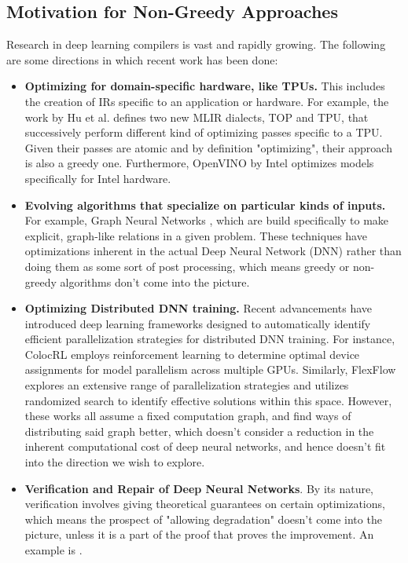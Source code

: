 \documentclass[12pt,a4paper,twoside,openright,bibliography=totocnumbered]{report}
\begin{document}
\subsection{Motivation for Non-Greedy Approaches}
Research in deep learning compilers is vast and rapidly growing. The following are some directions in which recent work has been done:
\begin{itemize}
	\item \textbf{Optimizing for domain-specific hardware, like TPUs.} This includes the creation of IRs specific to an application or hardware. For example, the work by Hu et al.\cite{hu2023tpumlircompilertpuusing} defines two new MLIR dialects, TOP and TPU, that successively perform different kind of optimizing passes specific to a TPU. Given their passes are atomic and by definition "optimizing", their approach is also a greedy one. Furthermore, OpenVINO \cite{openvino} by Intel optimizes models specifically for Intel hardware. 
	\item \textbf{Evolving algorithms that specialize on particular kinds of inputs.} For example, Graph Neural Networks \cite{wu2024hector}, which are build specifically to make explicit, graph-like relations in a given problem. These techniques have optimizations inherent in the actual Deep Neural Network (DNN) rather than doing them as some sort of post processing, which means greedy or non-greedy algorithms don't come into the picture.
    \item \textbf{Optimizing Distributed DNN training.} Recent advancements have introduced deep learning frameworks designed to automatically identify efficient parallelization strategies for distributed DNN training. For instance, ColocRL \cite{mirhoseini2017device} employs reinforcement learning to determine optimal device assignments for model parallelism across multiple GPUs. Similarly, FlexFlow \cite{jia2019beyond} explores an extensive range of parallelization strategies and utilizes randomized search to identify effective solutions within this space. However, these works all assume a fixed computation graph, and find ways of distributing said graph better, which doesn't consider a reduction in the inherent computational cost of deep neural networks, and hence doesn't fit into the direction we wish to explore.
    \item \textbf{Verification and Repair of Deep Neural Networks}. By its nature, verification involves giving theoretical guarantees on certain optimizations, which means the prospect of "allowing degradation" doesn't come into the picture, unless it is a part of the proof that proves the improvement. An example is \cite{vthakurverified}.
\end{itemize}
\end{document}
